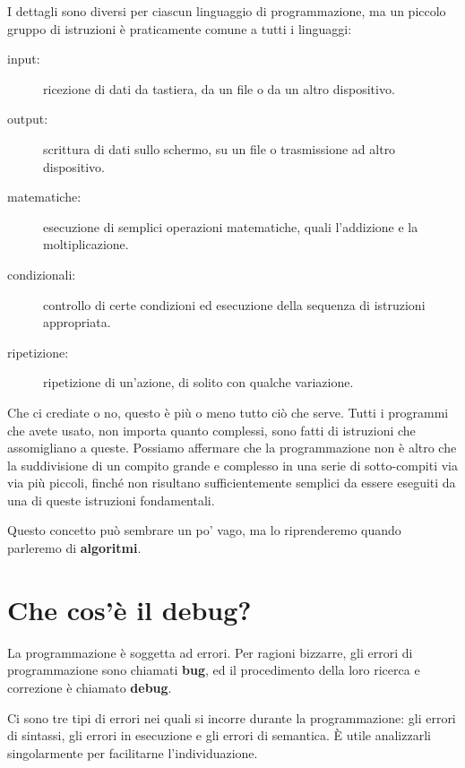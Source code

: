 \documentclass[10pt]{book}
\begin{document}
I dettagli sono diversi per ciascun linguaggio di programmazione, ma un piccolo gruppo di istruzioni è praticamente comune a tutti i linguaggi:

\begin{description}

\item[input:] ricezione di dati da tastiera, da un file o da un altro       dispositivo.

\item[output:] scrittura di dati sullo schermo, su un file o trasmissione ad    altro dispositivo.

\item[matematiche:] esecuzione di semplici operazioni matematiche, quali        l'addizione e la moltiplicazione.

\item[condizionali:] controllo di certe condizioni ed esecuzione della       sequenza di istruzioni appropriata.

\item[ripetizione:] ripetizione di un'azione, di solito con qualche      variazione.

\end{description}

Che ci crediate o no, questo è più o meno tutto ciò che serve. Tutti i   programmi che avete usato, non importa quanto complessi, sono fatti di istruzioni che assomigliano a queste. Possiamo affermare che la programmazione non è altro che la suddivisione di un compito grande e complesso in una serie di sotto-compiti via via più piccoli, finché non risultano sufficientemente semplici da essere eseguiti da una di queste istruzioni fondamentali.

Questo concetto può sembrare un po' vago, ma lo riprenderemo quando parleremo di {\bf algoritmi}.

\section{Che cos'è il debug?}

La programmazione è soggetta ad errori. Per ragioni bizzarre, gli errori di programmazione sono chiamati {\bf bug}, ed il procedimento della loro ricerca e correzione è chiamato {\bf debug}.

Ci sono tre tipi di errori nei quali si incorre durante la programmazione: gli errori di sintassi, gli errori in esecuzione e gli errori di semantica. È utile analizzarli singolarmente per facilitarne l'individuazione.
\end{document}
